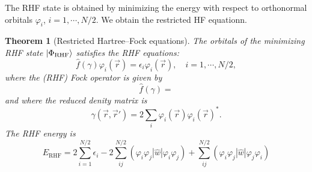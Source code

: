 \documentclass{report}
\theoremstyle{plain}
\newtheorem{theorem}{Theorem}[chapter]
\theoremstyle{definition}
\begin{document}
The RHF state is obtained by minimizing the energy with respect to
orthonormal orbitals $\varphi_i$, $i=1,\cdots,N/2$. We obtain the
restricted HF equationn.
\begin{theorem}[Restricted Hartree--Fock
  equations]\label{thm:rhf-eqns}
  The orbitals of the minimizing RHF state $\ket{\Phi_{\text{RHF}}}$
  satisfies the RHF equations:
  \begin{equation}
    \hat{f}(\gamma) \varphi_i(\vec{r}) = \epsilon_i
    \varphi_i(\vec{r}), \quad i =1,\cdots,N/2,\label{eq:rhf-eq}
  \end{equation}
  where the (RHF) Fock operator is given by
  \begin{equation}
    \hat{f}(\gamma) = 
  \end{equation}
  and where the reduced denity matrix is
  \begin{equation}
    \gamma(\vec{r},\vec{r}') = 2 \sum_{i}
    \varphi_i(\vec{r})\varphi_i(\vec{r})^*.
  \end{equation}
  The RHF energy is
  \begin{equation}
    E_\text{RHF} = 2\sum_{i=1}^{N/2} \epsilon_i - 2\sum_{ij}^{N/2}
    (\varphi_i\varphi_j|\hat{w}|\varphi_i\varphi_j) + \sum_{ij}^{N/2}
    (\varphi_i\varphi_j|\hat{w}|\varphi_j\varphi_i) \label{eq:rhf-energy2}
  \end{equation}
\end{theorem}
\end{document}
